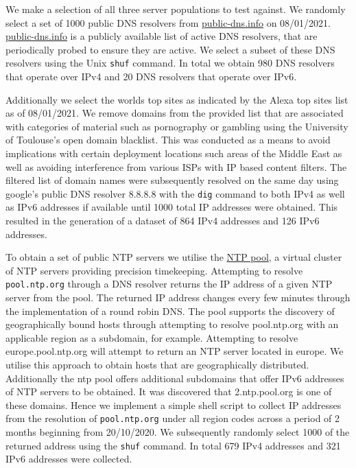 \documentclass{l4proj}
\begin{document}
We make a selection of all three server populations to test against. We randomly select a set of 1000 public DNS resolvers from \href{https://public-dns.info}{public-dns.info} on 08/01/2021. \href{https://public-dns.info}{public-dns.info} is a publicly available list of active DNS resolvers, that are periodically probed to ensure they are active. We select a subset of these DNS resolvers using the Unix \lstinline{shuf} command. In total we obtain 980 DNS resolvers that operate over IPv4 and 20 DNS resolvers that operate over IPv6.

Additionally we select the worlds top sites as indicated by the Alexa top sites list as of 08/01/2021. We remove domains from the provided list that are associated with categories of material such as pornography or gambling using the University of Toulouse's open domain blacklist. This was conducted as a means to avoid implications with certain deployment locations such areas of the Middle East as well as avoiding interference from various ISPs with IP based content filters. The filtered list of domain names were subsequently resolved on the same day using google's public DNS resolver 8.8.8.8 with the \lstinline{dig} command to both IPv4 as well as IPv6 addresses if available until 1000 total IP addresses were obtained. This resulted in the generation of a dataset of 864 IPv4 addresses and 126 IPv6 addresses.

To obtain a set of public NTP servers we utilise the \href{https://www.pool.ntp.org}{NTP pool}, a virtual cluster of NTP servers providing precision timekeeping. Attempting to resolve \lstinline{pool.ntp.org} through a DNS resolver returns the IP address of a given NTP server from the pool. The returned IP address changes every few minutes through the implementation of a round robin DNS. The pool supports the discovery of geographically bound hosts through attempting to resolve pool.ntp.org with an applicable region as a subdomain, for example. Attempting to resolve europe.pool.ntp.org will attempt to return an NTP server located in europe. We utilise this approach to obtain hosts that are geographically distributed. Additionally the ntp pool offers additional subdomains that offer IPv6 addresses of NTP servers to be obtained. It was discovered that 2.ntp.pool.org is one of these domains.
Hence we implement a simple shell script to collect IP addresses from the resolution of \lstinline{pool.ntp.org} under all region codes across a period of 2 months beginning from 20/10/2020. We subsequently randomly select 1000 of the returned address using the \lstinline{shuf} command. In total 679 IPv4 addresses and 321 IPv6 addresses were collected.
\end{document}
